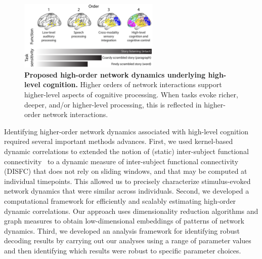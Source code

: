 \documentclass[english]{article}
\begin{document}
\begin{figure}[tp]
  \centering
  \includegraphics[width=0.6\textwidth]{figs/discussion}
  \caption{\textbf{Proposed high-order network dynamics underlying
      high-level cognition.}
    Higher orders of network interactions support higher-level aspects
    of cognitive processing.  When tasks evoke richer, deeper, and/or
    higher-level processing, this is reflected in higher-order network
    interactions.}
  \label{fig:discussion}
\end{figure}

Identifying higher-order network dynamics associated with high-level
cognition required several important methods advances.  First, we used
kernel-based dynamic correlations to extended the notion of (static)
inter-subject functional connectivity~\citep{SimoEtal16} to a dynamic
measure of inter-subject functional connectivity (DISFC) that does not
rely on sliding windows, and that may be computed at individual
timepoints.  This allowed us to precisely characterize stimulus-evoked
network dynamics that were similar across individuals.  Second, we
developed a computational framework for efficiently and scalably estimating
high-order dynamic correlations.  Our approach uses dimensionality
reduction algorithms and graph measures to obtain low-dimensional
embeddings of patterns of network dynamics.  Third, we developed an
analysis framework for identifying robust decoding results by carrying
out our analyses using a range of parameter values and then
identifying which results were robust to specific parameter choices.
\end{document}
